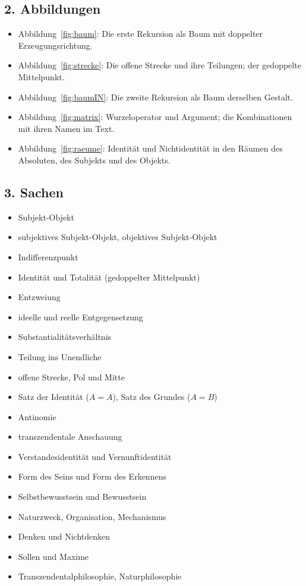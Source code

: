 \documentclass[11pt,a4paper]{article}
\newcommand{\SO}{Subjekt-Objekt}
\begin{document}
\subsection*{2. Abbildungen}
\begin{itemize}
\item Abbildung~\ref{fig:baum}: Die erste Rekursion als Baum mit doppelter Erzeugungsrichtung.
\item Abbildung~\ref{fig:strecke}: Die offene Strecke und ihre Teilungen; der gedoppelte Mittelpunkt.
\item Abbildung~\ref{fig:baumIN}: Die zweite Rekursion als Baum derselben Gestalt.
\item Abbildung~\ref{fig:matrix}: Wurzeloperator und Argument; die Kombinationen mit ihren Namen im Text.
\item Abbildung~\ref{fig:raeume}: Identität und Nichtidentität in den Räumen des Absoluten, des Subjekts und des Objekts.
\end{itemize}

\subsection*{3. Sachen}
\begin{itemize}
\item \SO{}
\item subjektives \SO{}, objektives \SO{}
\item Indifferenzpunkt
\item Identität und Totalität (gedoppelter Mittelpunkt)
\item Entzweiung
\item ideelle und reelle Entgegensetzung
\item Substantialitätsverhältnis
\item Teilung ins Unendliche
\item offene Strecke, Pol und Mitte
\item Satz der Identität ($A = A$), Satz des Grundes ($A = B$)
\item Antinomie
\item transzendentale Anschauung
\item Verstandesidentität und Vernunftidentität
\item Form des Seins und Form des Erkennens
\item Selbstbewusstsein und Bewusstsein
\item Naturzweck, Organisation, Mechanismus
\item Denken und Nichtdenken
\item Sollen und Maxime
\item Transzendentalphilosophie, Naturphilosophie
\end{itemize}
\end{document}

